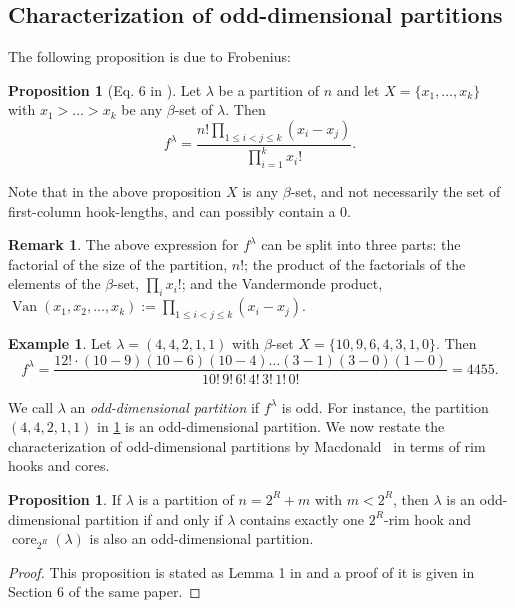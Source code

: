 \documentclass[12pt]{amsart}
\theoremstyle{definition}
\newtheorem{example}[theorem]{Example}
\newtheorem{remark}[theorem]{Remark}
\newtheorem{proposition}[theorem]{Proposition}
\numberwithin{equation}{section}
\newcommand{\la}{\lambda}
\DeclareMathOperator{\core}{{core}}
\DeclareMathOperator{\Vandermonde}{Van}
\begin{document}
\subsection{Characterization of odd-dimensional partitions}\label{hlfsec}
The following proposition is due to Frobenius:
\begin{proposition}[Eq. 6 in \cite{frobenius}]\label{HLF}
Let $\lambda$ be a partition of $n$ and let $X = \{x_1, \ldots, x_k\}$  with $x_1 > \ldots > x_k$ be any $\beta$-set of $\lambda$. Then
\[
f^{\lambda} = \dfrac{n!\prod\limits_{1\leq i<j\leq k} (x_i - x_j)}{\prod\limits_{i=1}^k x_i!}.
\]
\end{proposition}
Note that in the above proposition $X$ is any $\beta$-set, and not necessarily the set of first-column hook-lengths, and can possibly contain a 0.
\begin{remark}\label{rem:three-parts}
    The above expression for $f^\la$ can be split into three parts: the factorial of the size of the partition, $n!$; the product of the factorials of the elements of the $\beta$-set, $\prod_{i} x_i!$; and the Vandermonde product, $\Vandermonde(x_1, x_2, \ldots, x_k) :=  \prod\limits_{1\leq i<j\leq k} (x_i - x_j)$.
\end{remark}


\begin{example}\label{ex:f-la}
    Let $\lambda = (4,4,2,1,1)$ with $\beta$-set $X=\{10,9,6,4,3,1,0\}$. Then \[f^\lambda = \dfrac{12! \cdot (10-9)(10-6)(10-4)\ldots (3-1)(3-0)(1-0)}{10!\,9!\,6!\,4!\,3!\,1!\,0!}=4455.\]
\end{example}



We call $\lambda$ an \textit{odd-dimensional partition} if $f^{\lambda}$ is odd. For instance, the partition $(4,4,2,1,1)$ in \cref{ex:f-la} is an odd-dimensional partition.
We now restate the characterization of odd-dimensional partitions by Macdonald~\cite{mcd} in terms of rim hooks and cores. 

\begin{proposition}\label{mcdprop}
If $\lambda$ is a partition of $n = 2^R + m$ with $m < 2^R$, then
$\lambda$ is an odd-dimensional partition if and only if $\lambda$ contains exactly one $2^R$-rim hook and $\core_{2^R}(\lambda)$ is also an odd-dimensional partition.
\end{proposition}
\begin{proof}
This proposition is stated as Lemma 1 in \cite{aps} and a proof of it is given in Section 6 of the same paper.
\end{proof}
\end{document}
